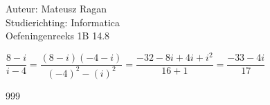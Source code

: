\documentclass[a4paper]{article}
\begin{document}
\noindent \large Auteur: Mateusz Ragan \\
\noindent \large Studierichting:  Informatica\\
\noindent \large Oefeningenreeks 1B 14.8\\

\medskip

\normalsize
$\dfrac{8-i}{i-4}  =  \dfrac{(8-i)(-4-i)}{(-4)^2 - (i)^2} = \dfrac{-32 -8i + 4i + i^2}{16 + 1} = \dfrac{-33 - 4i}{17}$



\begin{thebibliography}{999}
\end{thebibliography}
\end{document}
